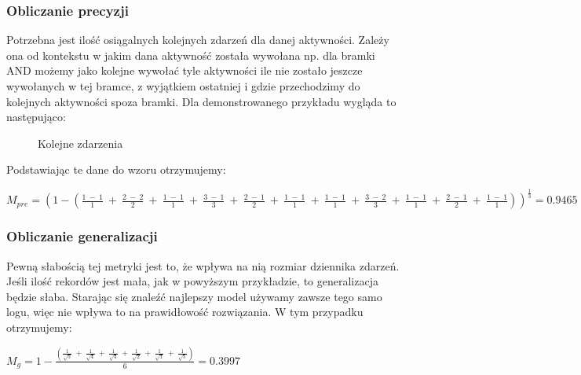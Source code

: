 \subsubsection{Obliczanie precyzji}
Potrzebna jest ilość osiągalnych kolejnych zdarzeń dla danej aktywności. Zależy ona od kontekstu w jakim dana aktywność została wywołana np. dla bramki AND możemy jako kolejne wywołać tyle aktywności ile nie zostało jeszcze wywołanych w tej bramce, z wyjątkiem ostatniej i gdzie przechodzimy do kolejnych aktywności spoza bramki. Dla demonstrowanego przykładu wygląda to następująco:

\begin{figure}[h]
	\caption{\label{fig:directly-follows}Kolejne zdarzenia}
\end{figure}

Podstawiając te dane do wzoru otrzymujemy:
\begin{center}
$M_{pre} = (1 - (\frac{1\ -\ 1}{1}\ +\ \frac{2\ -\ 2}{2}\ +\ \frac{1\ -\ 1}{1}\ +\ \frac{3\ -\ 1}{3}\ +\ \frac{2\ -\ 1}{2}\ +\ \frac{1\ -\ 1}{1}\ +\ \frac{1\ -\ 1}{1}\ +\ \frac{3\ -\ 2}{3}\ +\ \frac{1\ -\ 1}{1}\ +\ \frac{2\ -\ 1}{2}\ +\ \frac{1\ -\ 1}{1}))^{\frac{1}{3}} = 0.9465 $
\end{center}

\subsubsection{Obliczanie generalizacji}
 Pewną słabością tej metryki jest to, że wpływa na nią rozmiar dziennika zdarzeń. Jeśli ilość rekordów jest mała, jak w powyższym przykładzie, to generalizacja będzie słaba. Starając się znaleźć najlepszy model używamy zawsze tego samo logu, więc nie wpływa to na prawidłowość rozwiązania. W tym przypadku otrzymujemy:
\begin{center}
$M_g = 1 - \frac{(\frac{1}{\sqrt{5}}\ +\ \frac{1}{\sqrt{4}}\ +\ \frac{1}{\sqrt{4}}\ +\ \frac{1}{\sqrt{2}}\ +\ \frac{1}{\sqrt{1}}\ +\ \frac{1}{\sqrt{5}})}{6} = 0.3997$
\end{center}

